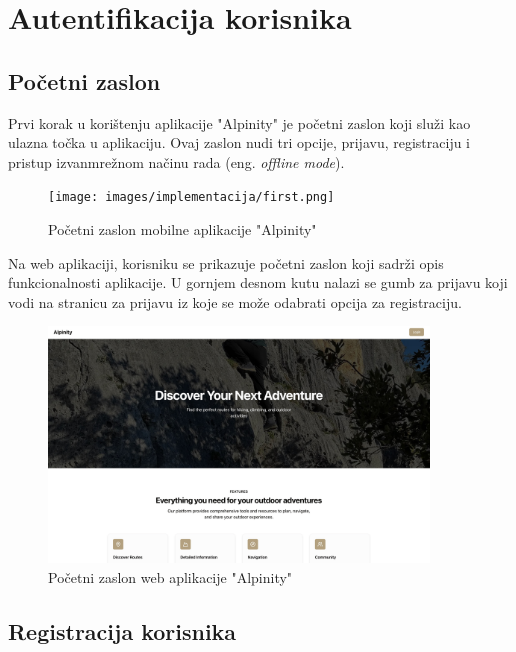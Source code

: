 \section{Autentifikacija korisnika}

\subsection{Početni zaslon}

Prvi korak u korištenju aplikacije "Alpinity" je početni zaslon koji služi kao ulazna točka u aplikaciju. Ovaj zaslon nudi tri opcije, prijavu, registraciju i pristup izvanmrežnom načinu rada (eng. \textit{offline mode}).

\begin{figure}[H]
    \centering
    \texttt{[image: images/implementacija/first.png]}
    \caption{Početni zaslon mobilne aplikacije "Alpinity"}
    \label{fig:prvi_zaslon}
\end{figure}

Na web aplikaciji, korisniku se prikazuje početni zaslon koji sadrži opis funkcionalnosti aplikacije. U gornjem desnom kutu nalazi se gumb za prijavu koji vodi na stranicu za prijavu iz koje se može odabrati opcija za registraciju.

\begin{figure}[H]
    \centering
    \includegraphics[width=0.9\textwidth]{images/implementacija/web/pocetni_zaslon.jpeg}
    \caption{Početni zaslon web aplikacije "Alpinity"}
    \label{fig:prvi_zaslon_web}
\end{figure}

\subsection{Registracija korisnika}


